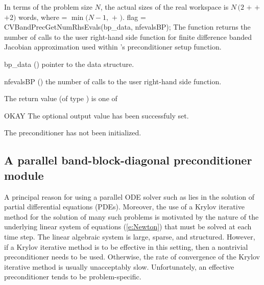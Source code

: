 {
  In terms of the problem size $N$, the actual sizes of the real workspace is
  $N\,(2$  $+$  $+$  $+2)$  words,
  where  = $\min(N-1 ,$  $+$ $)$.
}
{
  flag = CVBandPrecGetNumRhsEvals(bp\_data, nfevalsBP);
}
{
  The function  returns the
  number of calls to the user right-hand side function for
  finite difference banded Jacobian approximation used within
  {\cvbandpre}'s preconditioner setup function.
}
{
  \begin{args}[nfevalsBP]
  \item[bp\_data] ()
    pointer to the {\cvbandpre} data structure.
  \item[nfevalsBP] ()
    the number of calls to the user right-hand side function.
  \end{args}
}
{
  The return value  (of type ) is one of
  \begin{args}[BP\_NO\_DATA]
  \item[OKAY] 
    The optional output value has been successfuly set.
  \item[\Id{BP\_NO\_DATA}]
    The {\cvbandpre} preconditioner has not been initialized.
  \end{args}
}
{}

\subsection{A parallel band-block-diagonal preconditioner module}\label{sss:cvbbdpre}

A principal reason for using a parallel ODE solver such as {\cvode} lies
in the solution of partial differential equations (PDEs).  Moreover,
the use of a Krylov iterative method for the solution of many such
problems is motivated by the nature of the underlying linear system of
equations (\ref{e:Newton}) that must be solved at each time step.  The
linear algebraic system is large, sparse, and structured. However, if
a Krylov iterative method is to be effective in this setting, then a
nontrivial preconditioner needs to be used.  Otherwise, the rate of
convergence of the Krylov iterative method is usually unacceptably
slow.  Unfortunately, an effective preconditioner tends to be
problem-specific.


